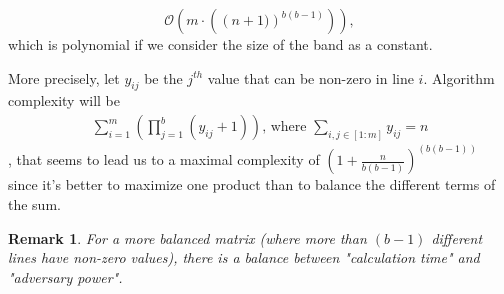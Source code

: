 \documentclass{article}
\newtheorem{remark}{Remark}
\begin{document}
\begin{equation*}
\mathcal{O}\left(
	m \cdot \left( \left(n+1)\right)^{b(b-1)}\right)
	\right),
\end{equation*}
which is polynomial if we consider the size of the band as a constant.

More precisely, let $y_{ij}$ be the $j^{th}$ value that can be non-zero in line $i$. Algorithm complexity will be  
\begin{align*}
\sum_{i=1}^m \left(\prod_{j=1}^b (y_{ij}+1)\right)\text{, where }\sum_{i, j \in [1:m]}y_{ij}=n
\end{align*}, that seems to lead us to a maximal complexity of $\left(1+\frac{n}{b(b-1)}\right)^{\left(b(b-1)\right)}$ since it's better to maximize one product than to balance the different terms of the sum.

\begin{remark}For a more balanced matrix (where more than $(b-1)$ different lines have non-zero values), there is a balance between "calculation time" and "adversary power".


\end{remark}
\end{document}
